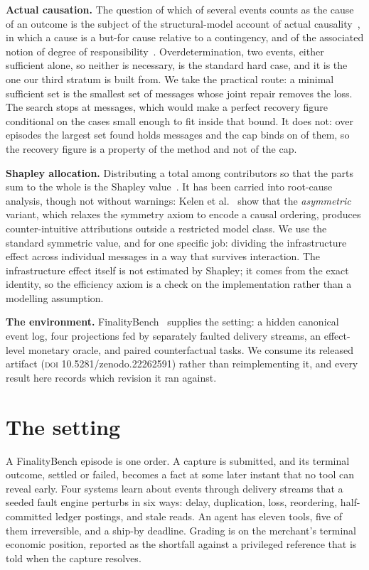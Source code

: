 \documentclass[conference]{IEEEtran}
\begin{document}
\textbf{Actual causation.} The question of which of several events counts as
the cause of an outcome is the subject of the structural-model account of
actual causality~\cite{halpern2016}, in which a cause is a but-for cause
relative to a contingency, and of the associated notion of degree of
responsibility~\cite{chockler2004}. Overdetermination, two events, either
sufficient alone, so neither is necessary, is the standard hard case, and it is
the one our third stratum is built from. We take the practical route: a minimal sufficient set is the smallest set of
messages whose joint repair removes the loss. The search stops at \searchCap{} messages, which would make a perfect
recovery figure conditional on the cases small enough to fit inside that
bound. It does not: over \ciEpisodes{} episodes the largest set found holds
\largestRepairSet{} messages and the cap binds on \capBound{} of them, so the
recovery figure is a property of the method and not of the cap.

\textbf{Shapley allocation.} Distributing a total among contributors so that
the parts sum to the whole is the Shapley value~\cite{shapley1953}. It has been
carried into root-cause analysis, though not without warnings: Kelen et
al.~\cite{shapleyrca} show that the \emph{asymmetric} variant, which relaxes the
symmetry axiom to encode a causal ordering, produces counter-intuitive
attributions outside a restricted model class. We use the standard symmetric
value, and for one specific job: dividing the infrastructure effect across
individual messages in a way that survives interaction. The infrastructure effect itself is not estimated by Shapley; it comes from
the exact identity, so the efficiency axiom is a check on the implementation
rather than a modelling assumption.

\textbf{The environment.} FinalityBench~\cite{finalitybench} supplies the
setting: a hidden canonical event log, four projections fed by separately
faulted delivery streams, an effect-level monetary oracle, and paired
counterfactual tasks. We consume its released
artifact (\textsc{doi} 10.5281/zenodo.22262591) rather than reimplementing it,
and every result here records which revision it ran against.

\section{The setting}

A FinalityBench episode is one order. A capture is submitted, and its terminal
outcome, settled or failed, becomes a fact at some later instant that no tool
can reveal early. Four systems learn about events through delivery streams that
a seeded fault engine perturbs in six ways: delay, duplication, loss,
reordering, half-committed ledger postings, and stale reads. An agent has
eleven tools, five of them irreversible, and a ship-by deadline. Grading is on
the merchant's terminal economic position, reported as the shortfall against a
privileged reference that is told when the capture resolves.
\end{document}
